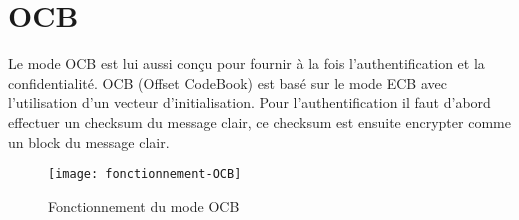 \section{OCB}
Le mode OCB est lui aussi conçu pour fournir à la fois l'authentification et la confidentialité. OCB (Offset CodeBook) est basé sur le mode ECB avec l'utilisation d'un vecteur d'initialisation. Pour l'authentification il faut d'abord effectuer un checksum du message clair, ce checksum est ensuite encrypter comme un block du message clair. 

\begin{figure}[!h]
  \centering
  \texttt{[image: fonctionnement-OCB]}
  \caption{Fonctionnement du mode OCB}
  \label{Fonctionnement du mode OCB}
\end{figure}



